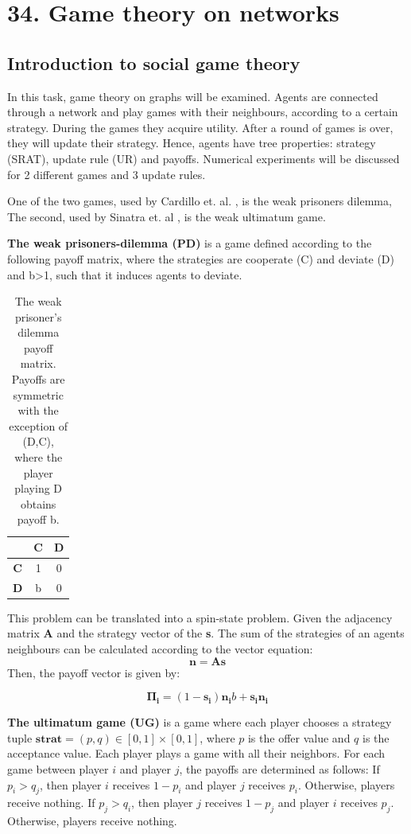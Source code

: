 \chapter{34. Game theory on networks}



\section{Introduction to social game theory}
In this task, game theory on graphs will be examined. Agents are connected through a network and play games with their neighbours, according to a certain strategy. During the games they acquire utility. After a round of games is over, they will update their strategy. Hence, agents have tree properties: strategy (SRAT), update rule (UR) and payoffs. Numerical experiments will be discussed for 2 different games and 3 update rules. 

One of the two games, used by Cardillo et. al. \cite{Prisonors}, is the weak prisoners dilemma,
The second, used by Sinatra et. al \cite{ultimatum}, is the weak ultimatum game.


\textbf{The weak prisoners-dilemma (PD)} is a game defined according to the following payoff matrix, where the strategies are cooperate (C) and deviate (D) and b>1, such that it induces agents to deviate.

\begin{table}[h!]
\centering
\begin{tabular}{c|c|c}
 & \textbf{C} & \textbf{D} \\ \hline
\textbf{C} & 1 & 0 \\ \hline
\textbf{D} & b & 0
\end{tabular}
\caption{The weak prisoner's dilemma payoff matrix. Payoffs are symmetric with the exception of (D,C), where the player playing D obtains payoff b.}
\label{table:weak-prisoners-dilemma}
\end{table}

This problem can be translated into a spin-state problem.
Given the adjacency matrix \textbf{A} and the strategy vector of the \textbf{s}. 
The sum of the strategies of an agents neighbours  can be calculated according to the vector equation:\[
\mathbf{n} = \mathbf{A} \mathbf{s}
\]Then, the payoff vector is given by:

\[ \mathbf{\Pi_i} = (1 - \mathbf{s_i})\mathbf{n_i}b + \mathbf{s_i}\mathbf{n_i} \]

\textbf{The ultimatum game (UG)} is a game where each player chooses a strategy tuple \( \textbf{strat} = (p, q) \in [0,1] \times [0,1] \), where \( p \) is the offer value and \( q \) is the acceptance value. Each player plays a game with all their neighbors.
For each game between player \( i \) and player \( j \), the payoffs are determined as follows:
If \( p_i > q_j \), then player \( i \) receives \( 1 - p_i \) and player \( j \) receives \( p_i \). Otherwise, players receive nothing.
If \( p_j > q_i \), then player \( j \) receives \( 1 - p_j \) and player \( i \) receives \( p_j \). Otherwise, players receive nothing.

